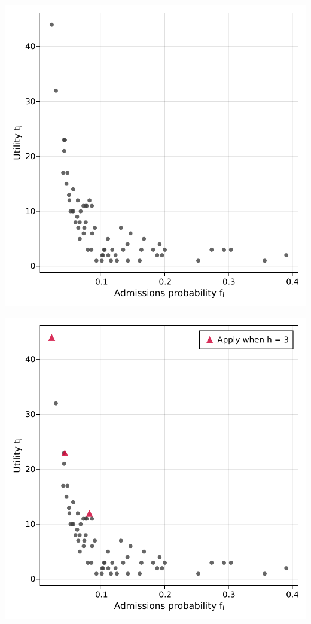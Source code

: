 \documentclass[11pt,mathserif,notheorems]{beamer}
\theoremstyle{definition}
\theoremstyle{definition}
\begin{document}
\begin{frame}[plain]{}
\begin{center}
\includegraphics[height=\textheight]{plots/samplemarket.pdf}
\end{center}
\end{frame}





\begin{frame}[plain]{}
\begin{center}
\includegraphics[height=\textheight]{plots/samplemarket-soln.pdf}
\end{center}
\end{frame}
\end{document}
